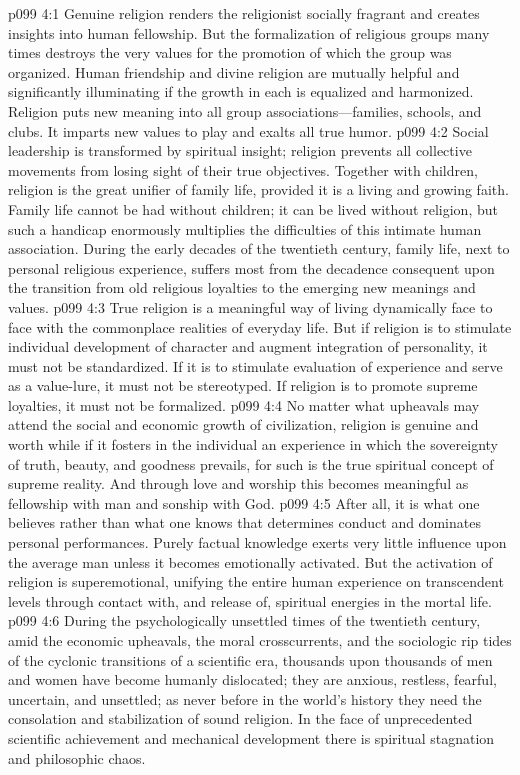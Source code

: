 \vs p099 4:1 Genuine religion renders the religionist socially fragrant and creates insights into human fellowship. But the formalization of religious groups many times destroys the very values for the promotion of which the group was organized. Human friendship and divine religion are mutually helpful and significantly illuminating if the growth in each is equalized and harmonized. Religion puts new meaning into all group associations---families, schools, and clubs. It imparts new values to play and exalts all true humor.
\vs p099 4:2 Social leadership is transformed by spiritual insight; religion prevents all collective movements from losing sight of their true objectives. Together with children, religion is the great unifier of family life, provided it is a living and growing faith. Family life cannot be had without children; it can be lived without religion, but such a handicap enormously multiplies the difficulties of this intimate human association. During the early decades of the twentieth century, family life, next to personal religious experience, suffers most from the decadence consequent upon the transition from old religious loyalties to the emerging new meanings and values.
\pc \vs p099 4:3 True religion is a meaningful way of living dynamically face to face with the commonplace realities of everyday life. But if religion is to stimulate individual development of character and augment integration of personality, it must not be standardized. If it is to stimulate evaluation of experience and serve as a value\hyp{}lure, it must not be stereotyped. If religion is to promote supreme loyalties, it must not be formalized.
\vs p099 4:4 No matter what upheavals may attend the social and economic growth of civilization, religion is genuine and worth while if it fosters in the individual an experience in which the sovereignty of truth, beauty, and goodness prevails, for such is the true spiritual concept of supreme reality. And through love and worship this becomes meaningful as fellowship with man and sonship with God.
\vs p099 4:5 After all, it is what one believes rather than what one knows that determines conduct and dominates personal performances. Purely factual knowledge exerts very little influence upon the average man unless it becomes emotionally activated. But the activation of religion is superemotional, unifying the entire human experience on transcendent levels through contact with, and release of, spiritual energies in the mortal life.
\pc \vs p099 4:6 During the psychologically unsettled times of the twentieth century, amid the economic upheavals, the moral crosscurrents, and the sociologic rip tides of the cyclonic transitions of a scientific era, thousands upon thousands of men and women have become humanly dislocated; they are anxious, restless, fearful, uncertain, and unsettled; as never before in the world’s history they need the consolation and stabilization of sound religion. In the face of unprecedented scientific achievement and mechanical development there is spiritual stagnation and philosophic chaos.\plusone
